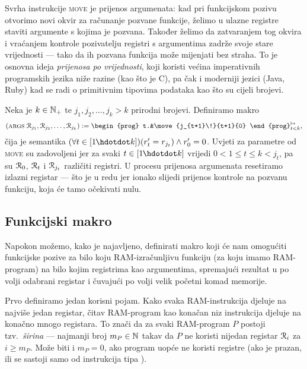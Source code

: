 Svrha instrukcije \textsc{move} je prijenos argumenata: kad pri funkcijskom pozivu otvorimo novi okvir za računanje pozvane funkcije, želimo u ulazne registre staviti argumente s kojima je pozvana. Također želimo da zatvaranjem tog okvira i vraćanjem kontrole pozivatelju registri s argumentima zadrže svoje stare vrijednosti --- tako da ih pozvana funkcija može mijenjati bez straha. To je osnovna ideja \emph{prijenosa po vrijednosti}, koji koristi većina imperativnih programskih jezika niže razine (kao što je C), pa čak i moderniji jezici (Java, Ruby) kad se radi o primitivnim tipovima podataka kao što su cijeli brojevi.

Neka je $k\in{\mathbb N}_+$ te $j_1,j_2,\dotsc,j_k>k$ prirodni brojevi. %
 Definiramo makro
\begin{equation}
    (\textsc{args} \;\reg{j_1},\reg{j_2},\dotsc,\reg{j_k}):=\begin{prog} t.&\move{j_{t+1}\!}{t+1}{0}
    \end{prog}^{\flat*}_{t<k}\text,
\end{equation}
čija je semantika $(\forall t\in[1\mspace{-1mu}\dd k])(r_t'=r_{j_t})\land r_0'=0$. Uvjeti za parametre od \textsc{move} su zadovoljeni jer za svaki $t\in[1\mspace{-1mu}\dd k]$ vrijedi $0<1\le t\le k<j_t$, pa su $\mathcal R_{0}$, $\mathcal R_{t}$ i $\mathcal R_{j_t}$ različiti registri. U procesu prijenosa argumenata resetiramo izlazni registar --- što je u redu jer ionako slijedi prijenos kontrole na pozvanu funkciju, koja će tamo očekivati nulu.

\subsection{Funkcijski makro}

Napokon možemo, kako je najavljeno, definirati makro koji će nam omogućiti funkcijske pozive za bilo koju RAM-izračunljivu funkciju (za koju imamo RAM-program) na bilo kojim registrima kao argumentima, spremajući rezultat u po volji odabrani registar i čuvajući po volji velik početni komad memorije.

Prvo definiramo jedan korisni pojam. Kako svaka RAM-instrukcija djeluje na najviše jedan registar, čitav RAM-program kao konačan niz instrukcija djeluje na konačno mnogo registara. To znači da za svaki RAM-program $P$ postoji tzv\!.\ \emph{širina} --- najmanji broj $m_P\in{\mathbb N}$ takav da $P$ ne koristi nijedan registar $\mathcal R_{i}$ za $i\ge m_P$. Može biti i $m_P=0$, ako program uopće ne koristi registre (ako je prazan, ili se sastoji samo od instrukcija tipa \goto).


